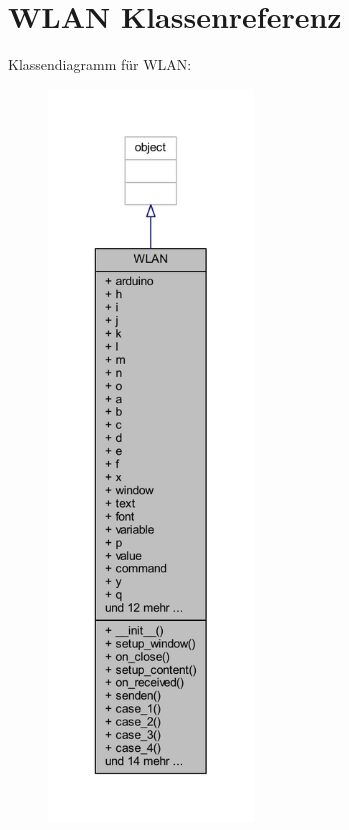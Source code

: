 \hypertarget{class_f_i_n_a_l___g_u_i___w_l_a_n_1_1_w_l_a_n}{}\section{W\+L\+AN Klassenreferenz}
\label{class_f_i_n_a_l___g_u_i___w_l_a_n_1_1_w_l_a_n}


Klassendiagramm für W\+L\+AN\+:
\nopagebreak
\begin{figure}[H]
\begin{center}
\leavevmode
\includegraphics[height=550pt]{class_f_i_n_a_l___g_u_i___w_l_a_n_1_1_w_l_a_n__inherit__graph}
\end{center}
\end{figure}


